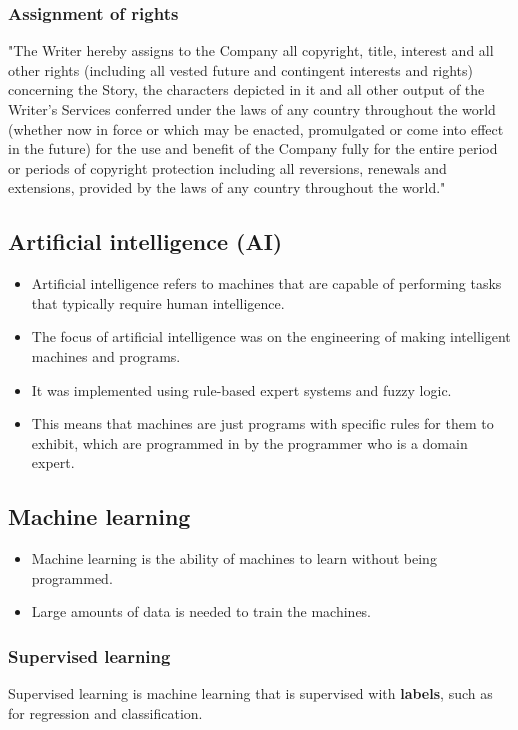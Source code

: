 \documentclass[11pt]{article}
\begin{document}
\clearpage
\subsubsection{Assignment of rights}
\label{sec:orgdf153b7}
"The Writer hereby assigns to the Company all copyright, title, interest and all other rights (including all vested future and contingent interests and rights) concerning the Story, the characters depicted in it and all other output of the Writer's Services conferred under the laws of any country throughout the world (whether now in force or which may be enacted, promulgated or come into effect in the future) for the use and benefit of the Company fully for the entire period or periods of copyright protection including all reversions, renewals and extensions, provided by the laws of any country throughout the world."
\subsection{Artificial intelligence (AI)}
\label{sec:org0d44678}
\begin{itemize}
\item Artificial intelligence refers to machines that are capable of performing tasks that typically require human intelligence.
\item The focus of artificial intelligence was on the engineering of making intelligent machines and programs.
\item It was implemented using rule-based expert systems and fuzzy logic.
\item This means that machines are just programs with specific rules for them to exhibit, which are programmed in by the programmer who is a domain expert.
\end{itemize}
\subsection{Machine learning}
\label{sec:org0caa147}
\begin{itemize}
\item Machine learning is the ability of machines to learn without being programmed.
\item Large amounts of data is needed to train the machines.
\end{itemize}
\subsubsection{Supervised learning}
\label{sec:org59f00f2}
Supervised learning is machine learning that is supervised with \textbf{labels}, such as for regression and classification.
\end{document}
